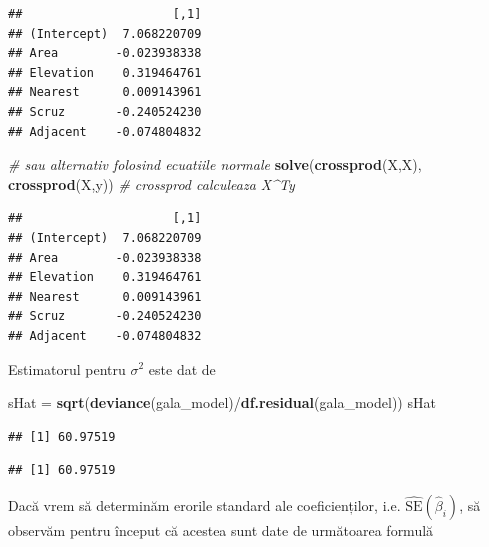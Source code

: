 \documentclass[]{article}
\newenvironment{Shaded}{\begin{snugshade}}{\end{snugshade}}
\newcommand{\KeywordTok}[1]{\textcolor[rgb]{0.13,0.29,0.53}{\textbf{{#1}}}}
\newcommand{\StringTok}[1]{\textcolor[rgb]{0.31,0.60,0.02}{{#1}}}
\newcommand{\CommentTok}[1]{\textcolor[rgb]{0.56,0.35,0.01}{\textit{{#1}}}}
\newcommand{\NormalTok}[1]{{#1}}
\begin{document}
\begin{verbatim}
##                     [,1]
## (Intercept)  7.068220709
## Area        -0.023938338
## Elevation    0.319464761
## Nearest      0.009143961
## Scruz       -0.240524230
## Adjacent    -0.074804832
\end{verbatim}

\begin{Shaded}
\begin{Highlighting}[]
\CommentTok{# sau alternativ folosind ecuatiile normale }
\KeywordTok{solve}\NormalTok{(}\KeywordTok{crossprod}\NormalTok{(X,X), }\KeywordTok{crossprod}\NormalTok{(X,y)) }\CommentTok{# crossprod calculeaza X^Ty}
\end{Highlighting}
\end{Shaded}

\begin{verbatim}
##                     [,1]
## (Intercept)  7.068220709
## Area        -0.023938338
## Elevation    0.319464761
## Nearest      0.009143961
## Scruz       -0.240524230
## Adjacent    -0.074804832
\end{verbatim}

Estimatorul pentru \(\sigma^2\) este dat de

\begin{Shaded}
\begin{Highlighting}[]
\NormalTok{sHat =}\StringTok{ }\KeywordTok{sqrt}\NormalTok{(}\KeywordTok{deviance}\NormalTok{(gala_model)/}\KeywordTok{df.residual}\NormalTok{(gala_model))}
\NormalTok{sHat}
\end{Highlighting}
\end{Shaded}

\begin{verbatim}
## [1] 60.97519
\end{verbatim}

\begin{Shaded}
\end{Shaded}

\begin{verbatim}
## [1] 60.97519
\end{verbatim}

Dacă vrem să determinăm erorile standard ale coeficienților, i.e.
\(\hat{\mathrm{SE}}(\hat\beta_i)\), să observăm pentru început că
acestea sunt date de următoarea formulă
\end{document}

